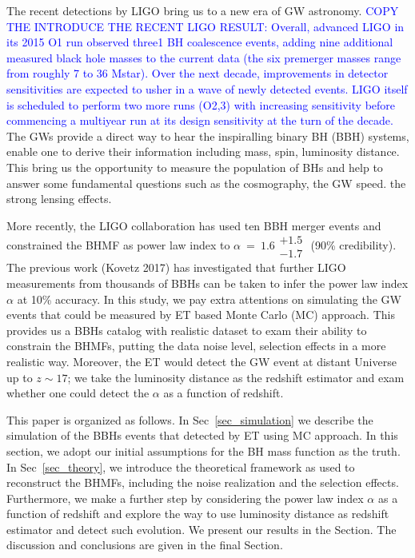 \documentclass[twocolumn]{aastex62}
\begin{document}
The recent detections by LIGO bring us to a new era of GW astronomy. \textcolor{blue}{COPY THE INTRODUCE THE RECENT LIGO RESULT: Overall, advanced LIGO in its 2015 O1 run observed three1 BH coalescence events, adding nine additional measured black hole masses to the current data (the six premerger masses range from roughly 7 to 36 Mstar). Over the next decade, improvements in detector sensitivities are expected to usher in a wave of newly detected events. LIGO itself is scheduled to perform two more runs (O2,3) with increasing sensitivity before commencing a multiyear run at its design sensitivity at the turn of the decade.} 
The GWs provide a direct way to hear the inspiralling binary BH (BBH) systems, enable one to derive their information including mass, spin, luminosity distance.
This bring us the opportunity to measure the population of BHs and help to answer some fundamental questions such as the cosmography, the GW speed. the strong lensing effects. 

More recently, the LIGO collaboration has used ten BBH merger events and constrained the BHMF as power law index to $\alpha~=~1.6\substack{+1.5\\-1.7}$ (90\% credibility). The previous work (Kovetz 2017) has investigated that further LIGO measurements from thousands of BBHs can be taken to infer the power law index $\alpha$ at 10\% accuracy. In this study, we pay extra attentions on simulating the GW events that could be measured by ET based Monte Carlo (MC) approach. This provides us a BBHs catalog with realistic dataset to exam their ability to constrain the BHMFs, putting the data noise level, selection effects in a more realistic way. Moreover, the ET would detect the GW event at distant Universe up to $z\sim17$; we take the luminosity distance as the redshift estimator and exam whether one could detect the $\alpha$ as a function of redshift.

This paper is organized as follows. In Sec~\ref{sec_simulation} we describe the simulation of the BBHs events that detected by ET using MC approach. In this section, we adopt our initial assumptions for the BH mass function as the truth. In Sec~\ref{sec_theory}, we introduce the theoretical framework as used to reconstruct the BHMFs, including the noise realization and the selection effects. Furthermore, we make a further step by considering the power law index $\alpha$ as a function of redshift and explore the way to use luminosity distance as redshift estimator and detect such evolution. We present our results in the Section. The discussion and conclusions are given in the final Section.
\end{document}
